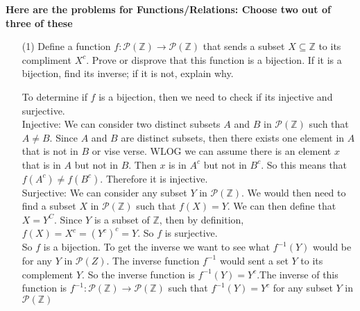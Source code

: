 \documentclass[answers,12pt]{exam}
\newcommand{\br}{\hfill \break}
\newcommand{\Z}{\mathbb{Z}}
\newcommand{\bs}{\begin{solution}}
\newcommand{\es}{\end{solution}}
\begin{document}
\br\textbf{Here are the problems for Functions/Relations: Choose two out of three of these}
\begin{enumerate}
    \item [(1)] Define a function \(f: \mathcal{P}(\Z) \to \mathcal{P}(\Z)\) that sends a subset \(X \subseteq \Z\) to its compliment \(X^ c\). Prove or disprove that this function is a bijection. If it is a bijection, find its inverse; if it is not, explain why.
    \bs
    To determine if \(f\) is a bijection, then we need to check if its injective and surjective. \\
    Injective: We can consider two distinct subsets \(A\) and \(B\) in \(\mathcal{P}(\Z)\) such that \(A \neq B\). Since \(A\) and \(B\) are distinct subsets, then there exists one element in \(A\) that is not in \(B\) or vise verse. WLOG we can assume there is an element \(x\) that is in \(A\) but not in \(B\). Then \(x\) is in \(A^c\) but not in \(B^c\). So this means that \(f(A^c) \neq f(B^c)\). Therefore it is injective.\\
    Surjective: We can consider any subset \(Y\) in \(\mathcal{P}(\Z)\). We would then need to find a subset \(X\) in \(\mathcal{P}(\Z)\) such that \(f(X) = Y\). We can then define that \(X = Y^C\). Since \(Y\) is a subset of \(\Z\), then by definition, \(f(X) = X^c = (Y^{c})^{c} = Y\). So \(f\) is surjective.\\
    So \(f\) is a bijection. To get the inverse we want to see what \(f^{-1}(Y)\) would be for any \(Y\) in \(\mathcal{P}(Z)\). The inverse function \(f^{-1}\) would sent a set \(Y\) to its complement \(Y\). So the inverse function is \(f^{-1}(Y) = Y^c\).The inverse of this function is \(f^{-1}: \mathcal{P}(\mathbb{Z}) \rightarrow \mathcal{P}(\mathbb{Z})\) such that \(f^{-1}(Y) = Y^c\) for any subset \(Y\) in \(\mathcal{P}(\mathbb{Z})\)
    \es
    

\end{enumerate}
\end{document}
